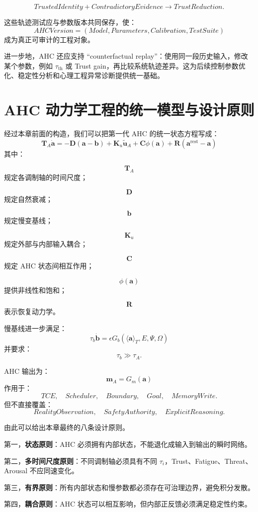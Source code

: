\[
TrustedIdentity
+
ContradictoryEvidence
\rightarrow
TrustReduction.
\]

这些轨迹测试应与参数版本共同保存，使：
\[
AHCVersion
=
(
Model,
Parameters,
Calibration,
TestSuite
)
\]
成为真正可审计的工程对象。

进一步地，AHC 还应支持 ``counterfactual replay''：使用同一段历史输入，修改某个参数，例如 $\tau_{\mathrm{th}}$ 或 Trust gain，再比较系统轨迹差异。这为后续控制参数优化、稳定性分析和心理工程异常诊断提供统一基础。


\section{AHC 动力学工程的统一模型与设计原则}

经过本章前面的构造，我们可以把第一代 AHC 的统一状态方程写成：
\[
\boxed{
\mathbf T_A\dot{\mathbf a}
=
-\mathbf D
(
\mathbf a-\mathbf b
)
+
\mathbf K_u
\tilde{\mathbf u}_A
+
\mathbf C
\phi(\mathbf a)
+
\mathbf R
(
\mathbf a^{\mathrm{rest}}-\mathbf a
)
}
\]
其中：

\[
\mathbf T_A
\]
规定各调制轴的时间尺度；

\[
\mathbf D
\]
规定自然衰减；

\[
\mathbf b
\]
规定慢变基线；

\[
\mathbf K_u
\]
规定外部与内部输入耦合；

\[
\mathbf C
\]
规定 AHC 状态间相互作用；

\[
\phi(\mathbf a)
\]
提供非线性和饱和；

\[
\mathbf R
\]
表示恢复动力学。

慢基线进一步满足：
\[
\boxed{
\tau_b\dot{\mathbf b}
=
\epsilon
G_b(
\langle\mathbf a\rangle_T,
E,
\Psi,
\Omega
)
}
\]
并要求：
\[
\tau_b
\gg
\tau_A.
\]

AHC 输出为：
\[
\boxed{
\mathbf m_A
=
G_m(\mathbf a)
}
\]
作用于：
\[
TCE,\quad
Scheduler,\quad
Boundary,\quad
Goal,\quad
MemoryWrite.
\]
但不直接覆盖：
\[
RealityObservation,
\quad
SafetyAuthority,
\quad
ExplicitReasoning.
\]

由此可以给出本章最终的八条设计原则。

第一，\textbf{状态原则}：AHC 必须拥有内部状态，不能退化成输入到输出的瞬时网络。

第二，\textbf{多时间尺度原则}：不同调制轴必须具有不同 $\tau_i$，Trust、Fatigue、Threat、Arousal 不应同速变化。

第三，\textbf{有界原则}：所有内部状态和慢参数都必须存在可治理边界，避免积分发散。

第四，\textbf{耦合原则}：AHC 状态可以相互影响，但内部正反馈必须满足稳定性约束。

